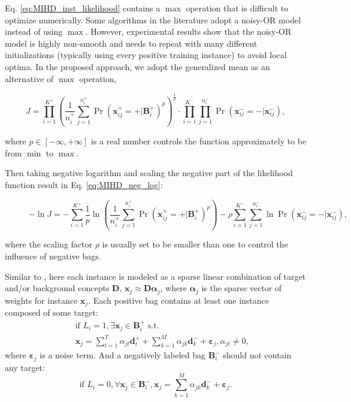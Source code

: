 \documentclass{article}
\begin{document}
	Eq. \eqref{eq:MIHD_inst_likelihood} contains a $\max$ operation that is difficult to optimize numerically. Some algorithms in the literature \cite{Maron:1998, Zhang:2002} adopt a noisy-OR model instead of using $\max$. However, experimental results show that the noisy-OR model is highly non-smooth and needs to repeat with many different initializations (typically using every positive training instance) to avoid local optima. In the proposed approach, we adopt the generalized mean as an alternative of $\max$ operation,
	\begin{small}
	\begin{equation}
	J=\prod_{i=1}^{K^+} \left(\frac{1}{n_i^+}\sum_{j=1}^{n_i^+}\Pr(\mathbf{x}_{ij}^+=+|\mathbf{B}_i^+)^p\right)^{\frac{1}{p}}\cdot \prod_{i=1}^{K^-}\prod_{j=1}^{n_i^-}\Pr(\mathbf{x}_{ij}^-=-|\mathbf{x}_{ij}^-),
	\label{eq:MIHD_gen_mean}
	\end{equation}
	\end{small}
	where $p\in [-\infty, +\infty]$ is a real number controls the function approximately to be from $\min$ to $\max$. 
	
	Then taking negative logarithm and scaling the negative part of the likelihood function result in Eq. \eqref{eq:MIHD_neg_log}:
\begin{figure}[!t]
	\begin{equation}
	-\ln J=-\sum_{i=1}^{K^+}\frac{1}{p}\ln \left(\frac{1}{n_i^+}\sum_{j=1}^{n_i^+}\Pr(\mathbf{x}_{ij}^+=+|\mathbf{B}_i^+)^p\right)-\rho \sum_{i=1}^{K^-}\sum_{j=1}^{n_i^-}\ln\Pr(\mathbf{x}_{ij}^-=-|\mathbf{x}_{ij}^-),
	\label{eq:MIHD_neg_log}
	\end{equation}
	\end{figure}
	where the scaling factor $\rho$ is usually set to be smaller than one to control the influence of negative bags. 
	
	Similar to \cite{jiao2016ICPR}, here each instance is modeled as a sparse linear combination of target and/or background concepts $\mathbf{D}$, $\mathbf{x}_j\approx\mathbf{D}\boldsymbol{\alpha}_j$, where $\boldsymbol{\alpha}_j$ is the sparse vector of  weights for instance $\mathbf{x}_j$. Each positive bag contains at least one instance composed of some target:
	\begin{eqnarray}
	&&\text{if }L_i = 1,  \nonumber \exists \mathbf{x}_j \in \mathbf{B}_i^+ \text{ s.t. } \\
	&&\mathbf{x}_j = \sum_{t=1}^{T}\alpha_{jt}\mathbf{d}_t^+ + \sum_{k=1}^{M} \alpha_{jk}\mathbf{d}_{k}^-+\boldsymbol{\varepsilon}_{j}, \alpha_{jt} \ne 0,
	\label{eq:MIHD_model_pos}
	\end{eqnarray}
	where $\boldsymbol{\varepsilon}_j$ is a noise term. And a negatively labeled bag $\mathbf{B}_i^-$ should not contain any target:
	\begin{equation}
	\text{if }L_i = 0,  \forall \mathbf{x}_j \in \mathbf{B}_i^-, \mathbf{x}_j =  \sum_{k=1}^{M} \alpha_{jk}\mathbf{d}_{k}^-+\boldsymbol{\varepsilon}_{j}.
	\label{eq:MIHD_model_neg}
	\end{equation}
	
\end{document}
